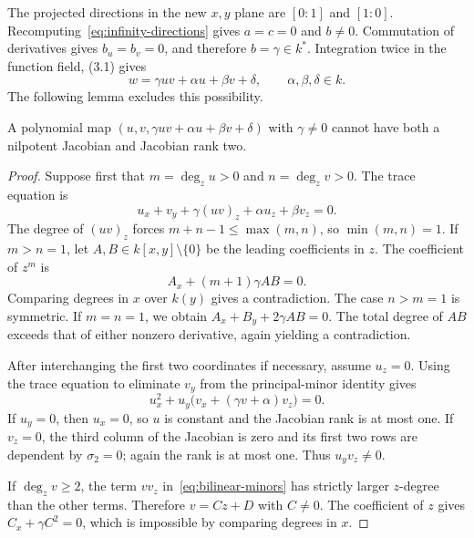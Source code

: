 The projected directions in the new $x,y$ plane are $[0:1]$ and $[1:0]$. Recomputing~\eqref{eq:infinity-directions} gives $a=c=0$ and $b\neq0$. Commutation of derivatives gives $b_u=b_v=0$, and therefore $b=\gamma\in k^*$. Integration twice in the function field, (3.1) gives
\begin{equation}\label{eq:bilinear-graph}
 w=\gamma uv+\alpha u+\beta v+\delta,\qquad \alpha,\beta,\delta\in k.
\end{equation}
The following lemma excludes this possibility.

\begin{lemma}\label{lem:bilinear-exclusion}
A polynomial map $(u,v,\gamma uv+\alpha u+\beta v+\delta)$ with $\gamma\neq0$ cannot have both a nilpotent Jacobian and Jacobian rank two.
\end{lemma}

\begin{proof}
Suppose first that $m=\deg_z u>0$ and $n=\deg_zv>0$. The trace equation is
\begin{equation}\label{eq:bilinear-trace}
 u_x+v_y+\gamma(uv)_z+\alpha u_z+\beta v_z=0.
\end{equation}
The degree of $(uv)_z$ forces $m+n-1\leq\max(m,n)$, so $\min(m,n)=1$. If $m>n=1$, let $A,B\in k[x,y]\setminus\{0\}$ be the leading coefficients in $z$. The coefficient of $z^m$ is
\[
 A_x+(m+1)\gamma AB=0.
\]
Comparing degrees in $x$ over $k(y)$ gives a contradiction. The case $n>m=1$ is symmetric. If $m=n=1$, we obtain $A_x+B_y+2\gamma AB=0$. The total degree of $AB$ exceeds that of either nonzero derivative, again yielding a contradiction.

After interchanging the first two coordinates if necessary, assume $u_z=0$. Using the trace equation to eliminate $v_y$ from the principal-minor identity gives
\begin{equation}\label{eq:bilinear-minors}
 u_x^2+u_y\bigl(v_x+(\gamma v+\alpha)v_z\bigr)=0.
\end{equation}
If $u_y=0$, then $u_x=0$, so $u$ is constant and the Jacobian rank is at most one. If $v_z=0$, the third column of the Jacobian is zero and its first two rows are dependent by $\sigma_2=0$; again the rank is at most one. Thus $u_yv_z\neq0$.

If $\deg_zv\geq2$, the term $vv_z$ in~\eqref{eq:bilinear-minors} has strictly larger $z$-degree than the other terms. Therefore $v=Cz+D$ with $C\neq0$. The coefficient of $z$ gives $C_x+\gamma C^2=0$, which is impossible by comparing degrees in $x$.
\end{proof}

